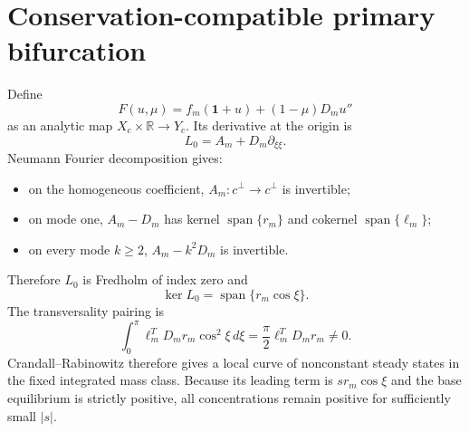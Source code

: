 \section*{Conservation-compatible primary bifurcation}
Define
\[
F(u,\mu)=f_m(\mathbf1+u)+(1-\mu)D_mu''
\]
as an analytic map $X_c\times\mathbb R\to Y_c$.  Its derivative at the
origin is
\[
L_0=A_m+D_m\partial_{\xi\xi}.
\]
Neumann Fourier decomposition gives:
\begin{itemize}
\item on the homogeneous coefficient, $A_m:c^\perp\to c^\perp$ is invertible;
\item on mode one, $A_m-D_m$ has kernel $\operatorname{span}\{r_m\}$ and
      cokernel $\operatorname{span}\{\ell_m\}$;
\item on every mode $k\ge2$, $A_m-k^2D_m$ is invertible.
\end{itemize}
Therefore $L_0$ is Fredholm of index zero and
\[
\ker L_0=\operatorname{span}\{r_m\cos\xi\}.
\]
The transversality pairing is
\[
\int_0^\pi\ell_m^TD_mr_m\cos^2\xi\,d\xi
=\frac\pi2\ell_m^TD_mr_m\neq0.
\]
Crandall--Rabinowitz therefore gives a local curve of nonconstant steady
states in the fixed integrated mass class.  Because its leading term is
$s r_m\cos\xi$ and the base equilibrium is strictly positive, all
concentrations remain positive for sufficiently small $|s|$.
